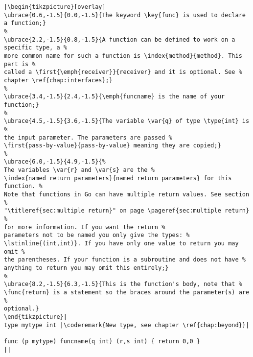 \begin{lstlisting}[caption=A function declaration,label=src:function definition]
|\begin{tikzpicture}[overlay]
\ubrace{0.6,-1.5}{0.0,-1.5}{The keyword \key{func} is used to declare a function;}
%
\ubrace{2.2,-1.5}{0.8,-1.5}{A function can be defined to work on a specific type, a %
more common name for such a function is \index{method}{method}. This part is %
called a \first{\emph{receiver}}{receiver} and it is optional. See %
chapter \ref{chap:interfaces};}
%
\ubrace{3.4,-1.5}{2.4,-1.5}{\emph{funcname} is the name of your function;}
%
\ubrace{4.5,-1.5}{3.6,-1.5}{The variable \var{q} of type \type{int} is %
the input parameter. The parameters are passed %
\first{pass-by-value}{pass-by-value} meaning they are copied;}
%
\ubrace{6.0,-1.5}{4.9,-1.5}{%
The variables \var{r} and \var{s} are the %
\index{named return parameters}{named return parameters} for this function. %
Note that functions in Go can have multiple return values. See section %
"\titleref{sec:multiple return}" on page \pageref{sec:multiple return} %
for more information. If you want the return %
parameters not to be named you only give the types: %
\lstinline{(int,int)}. If you have only one value to return you may omit %
the parentheses. If your function is a subroutine and does not have %
anything to return you may omit this entirely;}
%
\ubrace{8.2,-1.5}{6.3,-1.5}{This is the function's body, note that %
\func{return} is a statement so the braces around the parameter(s) are %
optional.}
\end{tikzpicture}|
type mytype int	|\coderemark{New type, see chapter \ref{chap:beyond}}|

func (p mytype) funcname(q int) (r,s int) { return 0,0 }
||
\end{lstlisting}
